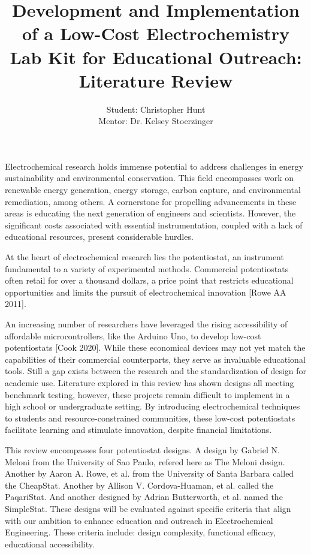 \documentclass{article}
\title{\textcolor{mycolor}{\textbf{{\huge Development and Implementation of a Low-Cost Electrochemistry Lab Kit for Educational Outreach: Literature Review}}}}
\author{Student: Christopher Hunt \\ Mentor: Dr. Kelsey Stoerzinger}
\date{}
\begin{document}
\pagestyle{fancy}
\fancyhf{}
\rfoot{}
\rhead{\thepage}
\maketitle
Electrochemical research holds immense potential to address challenges in energy sustainability and environmental conservation. This field encompasses work on renewable energy generation, energy storage, carbon capture, and environmental remediation, among others. A cornerstone for propelling advancements in these areas is educating the next generation of engineers and scientists. However, the significant costs associated with essential instrumentation, coupled with a lack of educational resources, present considerable hurdles.

At the heart of electrochemical research lies the potentiostat, an instrument fundamental to a variety of experimental methods. Commercial potentiostats often retail for over a thousand dollars, a price point that restricts educational opportunities and limits the pursuit of electrochemical innovation [Rowe AA 2011].

An increasing number of researchers have leveraged the rising accessibility of affordable microcontrollers, like the Arduino Uno, to develop low-cost potentiostats [Cook 2020]. While these economical devices may not yet match the capabilities of their commercial counterparts, they serve as invaluable educational tools. Still a gap exists between the research and the standardization of design for academic use. Literature explored in this review has shown designs all meeting benchmark testing, however, these projects remain difficult to implement in a high school or undergraduate setting. By introducing electrochemical techniques to students and resource-constrained communities, these low-cost potentiostats facilitate learning and stimulate innovation, despite financial limitations.

This review encompasses four potentiostat designs. A design by Gabriel N. Meloni from the University of Sao Paulo, refered here as The Meloni design. Another by Aaron A. Rowe, et al. from the University of Santa Barbara called the CheapStat. Another by Allison V. Cordova-Huaman, et al. called the PaqariStat. And another designed by Adrian Butterworth, et al. named the SimpleStat. These designs will be evaluated against specific criteria that align with our ambition to enhance education and outreach in Electrochemical Engineering. These criteria include: design complexity, functional efficacy, educational accessibility. 
 
\end{document}
